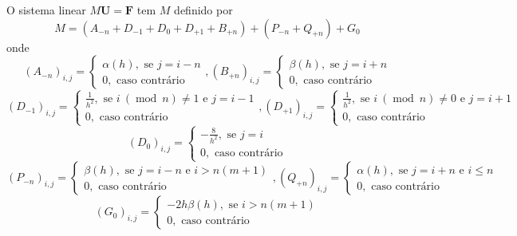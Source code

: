 \documentclass{article}
\begin{document}
    O sistema linear $M \mathbf{U} = \mathbf{F}$ tem $M$ definido por
    \[M = (A_{-n} + D_{-1} + D_0 + D_{+1} + B_{+n}) + (P_{-n}+Q_{+n}) + G_0\]
    onde
    \[(A_{-n})_{i,j} = \begin{cases}
        \displaystyle \alpha(h), \text{ se $j = i-n$}\\[.2cm]
        0, \text{ caso contrário}
    \end{cases}, (B_{+n})_{i,j} = \begin{cases}
        \displaystyle \beta(h), \text{ se $j = i+n$}\\[.2cm]
        0, \text{ caso contrário}
    \end{cases}\]
    \[(D_{-1})_{i,j} = \begin{cases}
        \displaystyle \frac{1}{h^2}, \text{ se $i\ (\operatorname{mod}\ n) \neq 1$ e $j = i-1$}\\[.2cm]
        0, \text{ caso contrário}
    \end{cases}, (D_{+1})_{i,j} = \begin{cases}
        \displaystyle \frac{1}{h^2}, \text{ se $i\ (\operatorname{mod}\ n) \neq 0$ e $j = i+1$}\\[.2cm]
        0, \text{ caso contrário}
    \end{cases}\]
    \[(D_{0})_{i,j} = \begin{cases}
        \displaystyle -\frac{8}{h^2}, \text{ se $j = i$}\\[.2cm]
        0, \text{ caso contrário}
    \end{cases}\]
    \[(P_{-n})_{i,j} = \begin{cases}
        \displaystyle \beta(h), \text{ se $j = i-n$ e $i > n(m+1)$}\\[.2cm]
        0, \text{ caso contrário}
    \end{cases}, (Q_{+n})_{i,j} = \begin{cases}
        \displaystyle \alpha(h), \text{ se $j = i+n$ e $i \leq n$}\\[.2cm]
        0, \text{ caso contrário}
    \end{cases}\]
    \[(G_0)_{i,j} = \begin{cases}
        \displaystyle -2h\beta(h), \text{ se $i > n(m+1)$}\\[.2cm]
        0, \text{ caso contrário}
    \end{cases}\]
\end{document}

